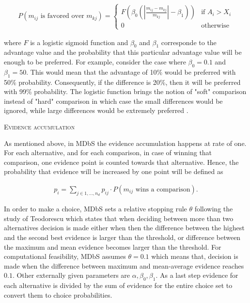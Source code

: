 \documentclass[a4paper,12pt]{article}
\newcommand{\citeyearonly}[1]{\citeyearpar{#1}}
\begin{document}
\begin{align}\label{probabilityOneIsFavored}
    P(m_{ij} \text{ is favored over } m_{kj}) = 
        \begin{cases}
        F(\beta_0 (| \frac{m_{ij} - m_{kj}}{m_{kj}} |- \beta_1)) & \text{if } A_i > X_i \\
        0 & \text{otherwise}
        \end{cases}
\end{align}

where $F$ is a logistic sigmoid function and $\beta_0$ and $\beta_1$ corresponde to the advantage value and the probability that this particular advantage value will be enough to be preferred. For example, consider the case where $\beta_0 = 0.1$ and $\beta_1 = 50$. This would mean that the advantage of 10\% would be preferred with 50\% probability. Consequently, if the difference is 20\%, then it will be preferred with 99\% probability. The logistic function brings the notion of "soft" comparison instead of "hard" comparison in which case the small differences would be ignored, while large differences would be extremely preferred \citep{noguchi2018multialternative}.

\textsc{Evidence accumulation}

As mentioned above, in MDbS the evidence accumulation happens at rate of one. For each alternative, and for each comparison, in case of winning that comparison, one evidence point is counted towards that alternative. Hence, the probability that evidence will be increased by one point will be defined as 

\begin{align}\label{probabilityOfEvidenceIncreasing}
    p_i = \sum_{j \in {1, \ldots, n_d}} p_{ij} \cdot P(m_{ij} \text{ wins a comparison}).
\end{align}

In order to make a choice, MDbS sets a relative stopping rule $\theta$ following the study of Teodorescu \citeyearonly{teodorescu2013disentangling} which states that when deciding between more than two alternatives decision is made either when then the difference between the highest and the second best evidence is larger than the threshold, or difference between the maximum and mean evidence becomes larger than the threshold. For computational feasibility, MDbS assumes $\theta = 0.1$ which means that, decision is made when the difference between maximum and mean-average evidence reaches $0.1$. Other externally given parameters are $\alpha, \beta_0, \beta_1$. As a last step evidence for each alternative is divided by the sum of evidence for the entire choice set to convert them to choice probabilities.
\end{document}
